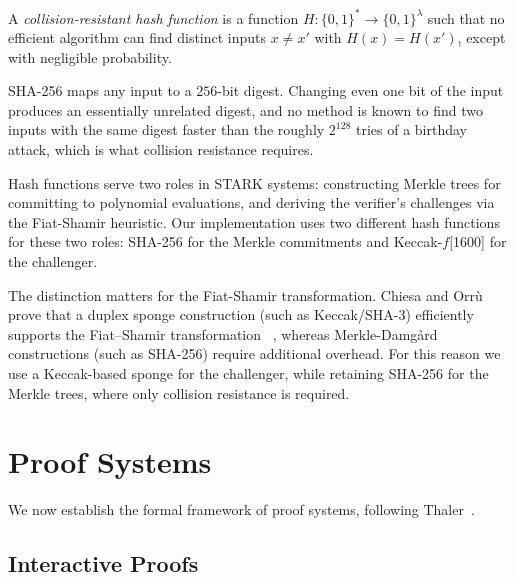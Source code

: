 \begin{definition}
\label{def:hash}
A \emph{collision-resistant hash function} is a function
$H : \{0,1\}^* \to \{0,1\}^\lambda$ such that no efficient algorithm
can find distinct inputs $x \neq x'$ with $H(x) = H(x')$, except
with negligible probability.
\end{definition}

\begin{example}
\label{ex:hash}
SHA-256 maps any input to a $256$-bit digest. Changing even one bit of
the input produces an essentially unrelated digest, and no method is
known to find two inputs with the same digest faster than the roughly
$2^{128}$ tries of a birthday attack, which is what collision resistance
requires.
\end{example}

Hash functions serve two roles in STARK systems: constructing Merkle
trees for committing to polynomial evaluations, and deriving the
verifier's challenges via the Fiat-Shamir heuristic. Our
implementation uses two different hash functions for these two roles:
SHA-256 for the Merkle commitments and Keccak-$f$[1600] for the
challenger.

The distinction matters for the Fiat-Shamir transformation. Chiesa and
Orr\`{u}~\cite{CO25} prove that a duplex sponge construction (such as Keccak/SHA-3)
efficiently supports the Fiat–Shamir transformation ~\cite{CO25}, whereas 
Merkle-Damgård constructions (such as SHA-256) require additional overhead.
For this reason we use a Keccak-based sponge for the challenger, while 
retaining SHA-256 for the Merkle trees, where only collision resistance is required.


\section{Proof Systems}
\label{sec:proofs}

We now establish the formal framework of proof systems, following
Thaler~\cite{Thaler22}.


\subsection{Interactive Proofs}
\label{subsec:interactive_proofs}

